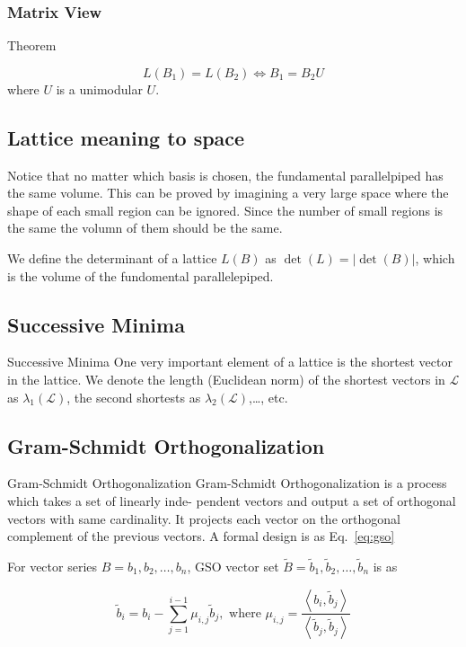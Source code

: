 \documentclass{beamer}
\begin{document}
	\subsubsection{Matrix View}
	\begin{frame}{Theorem}
		\begin{theorem}
			\begin{equation}
				L(B_1)=L(B_2) \iff B_1=B_2U
			\end{equation}
			where $U$ is a unimodular $U$.
		\end{theorem}
	\end{frame}
	
	\subsection{Lattice meaning to space}
	\begin{frame}
	\end{frame}
	
	\begin{frame}
		Notice that no matter which basis is chosen, the fundamental parallelpiped has the same volume. This can be proved by imagining a very large space where the shape of each small region can be ignored. Since the number of small regions is the same the volumn of them should be the same.
		
		We define the determinant of a lattice $L(B)$ as  $\det(L)=|\det(B)|$, which is the volume of the fundomental parallelepiped.
	\end{frame}
	\subsection{Successive Minima}
	\begin{frame}{Successive Minima}
		One very important element of a lattice is the shortest vector in the lattice. We denote the length (Euclidean norm) of the shortest vectors in $\mathcal{L}$ as $\lambda_1(\mathcal{L})$, the second shortests as $\lambda_2(\mathcal{L})$,\ldots, etc. 
	\end{frame}
	\subsection{Gram-Schmidt Orthogonalization}
	\begin{frame}{Gram-Schmidt Orthogonalization}
		Gram-Schmidt Orthogonalization is a process which takes a set of linearly inde- pendent vectors and output a set of orthogonal vectors with same cardinality. It projects each vector on the orthogonal complement of the previous vectors. A formal design is as Eq.~\ref{eq:gso}
		
		For vector series $B=b_{1}, b_{2}, \ldots, b_{n}$, GSO vector set $\widetilde B=\tilde{b}_{1}, \tilde{b}_{2}, \ldots, \tilde{b}_{n}$ is as
		
		\begin{equation}
			\label{eq:gso}
			\tilde{b}_{i}=b_{i}-\sum_{j=1}^{i-1} \mu_{i, j} \tilde{b}_{j}, \text { where } \mu_{i, j}=\frac{\left\langle b_{i}, \tilde{b}_{j}\right\rangle}{\left\langle\tilde{b}_{j}, \tilde{b}_{j}\right\rangle}
		\end{equation}
	\end{frame}
\end{document}
